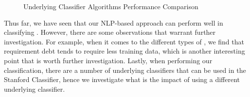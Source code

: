 \begin{figure}[!thb]
  \centering
  \caption{Underlying Classifier Algorithms Performance Comparison}
  \label{fig:algorithms_comparison}
\end{figure}

Thus far, we have seen that our NLP-based approach can perform well in classifying \SATD. However, there are some observations that warrant further investigation. For example, when it comes to the different types of \SATD, we find that requirement debt tends to require less training data, which is another interesting point that is worth further investigation. Lastly, when performing our classification, there are a number of underlying classifiers that can be used in the Stanford Classifier, hence we investigate what is the impact of using a different underlying classifier. 


